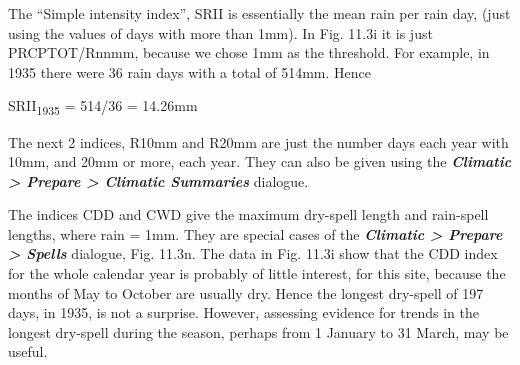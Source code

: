 \documentclass[
  letterpaper,
  DIV=11,
  numbers=noendperiod]{scrreprt}
\begin{document}
The ``Simple intensity index'', SRII is essentially the mean rain per
rain day, (just using the values of days with more than 1mm). In Fig.
11.3i it is just PRCPTOT/Rnnmm, because we chose 1mm as the threshold.
For example, in 1935 there were 36 rain days with a total of 514mm.
Hence

SRII\textsubscript{1935} = 514/36 = 14.26mm

The next 2 indices, R10mm and R20mm are just the number days each year
with 10mm, and 20mm or more, each year. They can also be given using the
\textbf{\emph{Climatic \textgreater{} Prepare \textgreater{} Climatic
Summaries}} dialogue.

The indices CDD and CWD give the maximum dry-spell length and rain-spell
lengths, where rain = 1mm. They are special cases of the
\textbf{\emph{Climatic \textgreater{} Prepare \textgreater{} Spells}}
dialogue, Fig. 11.3n. The data in Fig. 11.3i show that the CDD index for
the whole calendar year is probably of little interest, for this site,
because the months of May to October are usually dry. Hence the longest
dry-spell of 197 days, in 1935, is not a surprise. However, assessing
evidence for trends in the longest dry-spell during the season, perhaps
from 1 January to 31 March, may be useful.
\end{document}
